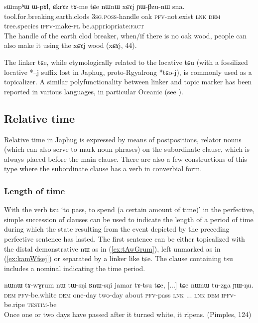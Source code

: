 \documentclass[oldfontcommands,oneside,a4paper,11pt]{article}
\newcommand{\ipa}[1]{{\phon \mbox{#1}}} %
\newcommand{\refb}[1]{(\ref{#1})}
\begin{document}
\begin{exe}
\ex \label{ex:CkrAz.tAme}
\gll 
   	\ipa{sɯmpʰɯ}  	\ipa{ɯ-pɤl,}  	\ipa{ɕkrɤz}  	\ipa{tɤ-me}  	\ipa{tɕe}  	\ipa{nɯnɯ}  	\ipa{xɕɤj}  	\ipa{ɲɯ-βzu-nɯ}  	\ipa{sna.}  \\
   	tool.for.breaking.earth.clods \textsc{3sg.poss}-handle oak \textsc{pfv}-not.exist \textsc{lnk} \textsc{dem} tree.species \textsc{ipfv}-make-\textsc{pl} be.appriopriate:\textsc{fact} \\
\glt The handle of the earth clod breaker, when/if there is no oak wood, people can also make it using the \ipa{xɕɤj} wood (\ipa{xɕɤj}, 44).
\end{exe}
 
 The linker \ipa{tɕe}, while etymologically related to the locative \ipa{tɕu} (with a fossilized locative *\ipa{--j} suffix lost in Japhug, proto-Rgyalrong *\ipa{tɕo-j}), is commonly used as a topicalizer. A similar polyfunctionality between linker and topic marker has been reported in various languages, in particular Oceanic   (see  \citealt{bril10oceanic}).
  
\subsection{Relative time} \label{sec:relative.time}
Relative time in Japhug is expressed by means of postpositions, relator nouns (which can also serve to mark noun phrases) on the subordinate clause, which is always placed before the main clause. There are also a few constructions of this type where the subordinate clause has a verb in converbial form. 





 \subsubsection{Length of time}
With the verb \ipa{tsu} `to pass, to spend (a certain amount of time)' in the perfective, simple succession of clauses can be used to indicate the length of a period of time during which the state resulting from the event depicted by the preceding perfective sentence has lasted.  The first sentence can be either topicalized with the distal demonstrative \ipa{nɯ} as in \refb{ex:tAwGrum}, left unmarked as in \refb{ex:kamWfsej} or separated by a linker like \ipa{tɕe}. The clause containing \ipa{tsu} includes a nominal indicating the time period.

\begin{exe}
\ex \label{ex:tAwGrum}
\gll 
\ipa{nɯnɯ}   	\ipa{tɤ-wɣrum}   	\ipa{nɯ}   	\ipa{tɯ-sŋi}   	\ipa{ʁnɯ-sŋi}   	\ipa{jamar}   	\ipa{tɤ-tsu}   	\ipa{tɕe,}   	[...] 	\ipa{tɕe}   	\ipa{nɯnɯ}   	\ipa{tu-zga}   	\ipa{ɲɯ-ŋu.}   \\
\textsc{dem} \textsc{pfv}-be.white \textsc{dem} one-day two-day about \textsc{pfv}-pass \textsc{lnk} ... \textsc{lnk} \textsc{dem} \textsc{ipfv}-be.ripe \textsc{testim}-be \\
\glt  Once one or two days have passed after it turned white, it   ripens. (Pimples, 124)
\end{exe}
\end{document}
